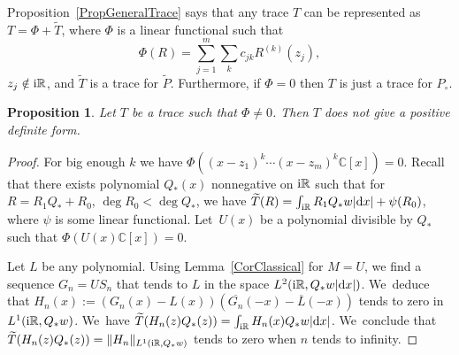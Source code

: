 \documentclass[10pt,a4paper]{amsart}
\newcommand{\RN}{\mathbb{R}} %
\newcommand{\CN}{\mathbb{C}} %
\newcommand{\ovl}{\overline}
\newtheorem{Proposition}[Theorem]{Proposition}
\theoremstyle{definition}
\numberwithin{equation}{section}
\begin{document}
Proposition~\ref{PropGeneralTrace} says that any trace $T$ can be represented as $T=\Phi+\widetilde{T}$, where $\Phi$ is a linear functional such that
\[
\Phi(R)=\sum_{j=1}^m\sum_k c_{jk} R^{(k)}(z_j),
\]
 $z_j\notin {\rm i}\RN$, and $\widetilde{T}$ is a trace for $\widetilde{P}$. Furthermore, if $\Phi=0$ then $T$ is just a trace for $P_\circ$.

\begin{Proposition}
\label{PropPositivePhiIsZero}
Let $T$ be a trace such that $\Phi\neq 0$. Then $T$ does not give a positive definite form.
\end{Proposition}
\begin{proof}
For big enough $k$ we have $\Phi((x-z_1)^k\cdots (x-z_m)^k \CN[x])=0$. Recall that there exists polynomial $Q_*(x)$ nonnegative on ${\rm i}\RN$ such that for $R=R_1Q_*+R_0$, $\deg R_0<\deg Q_*$, we have $\widetilde{T}(R)=\int_{{\rm i}\RN} R_1Q_* w |{\rm d}x|+\psi(R_0)$, where $\psi$ is some linear functional. Let~$U(x)$ be a polynomial divisible by $Q_*$ such that $\Phi(U(x)\CN[x])=0$.

Let $L$ be any polynomial. Using Lemma~\ref{CorClassical} for $M=U$, we find a sequence $G_n=US_n$ that tends to $L$ in the space $L^2({\rm i}\RN, Q_*w|{\rm d}x|)$. We~deduce that $H_n(x):=(G_n(x)-L(x))(\ovl{G_n}(-x)-\ovl{L}(-x))$ tends to zero in $L^1({\rm i}\RN,Q_*w)$. We~have $\widetilde{T}(H_n(z)Q_*(z))=\int_{{\rm i}\RN}H_n(x) Q_* w|{\rm d}x|$. We~conclude that $\widetilde{T}(H_n(z)Q_*(z))=\|H_n\|_{L^1({\rm i}\RN,Q_*w)}$ tends to zero when $n$ tends to infinity.


\end{proof}
\end{document}
